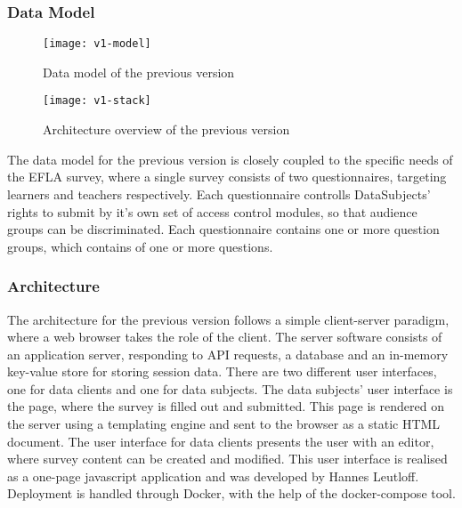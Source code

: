    \subsubsection{Data Model}

   \begin{figure}[H]
        \centering
        \texttt{[image: v1-model]}
        \caption{Data model of the previous version}
        \label{fig:v1-data-model}
    \end{figure}

    \begin{wrapfigure}{o}{.5\textwidth}
        \centering
        \texttt{[image: v1-stack]}
        \caption{Architecture overview of the previous version}
        \label{fig:v1-stack}
    \end{wrapfigure}

    The data model for the previous version is closely coupled to the specific needs of the
    EFLA survey, where a single survey consists of two questionnaires, targeting
    learners and teachers respectively.
    Each questionnaire controlls DataSubjects' rights to submit by it's own set of access 
    control modules, so that audience groups can be discriminated.
    Each questionnaire contains one or more question groups, which contains of
    one or more questions.

    \subsubsection{Architecture}
        The architecture for the previous version follows a simple client-server paradigm, where
        a web browser takes the role of the client. The server software consists of an
        application server, responding to API requests, a database and an in-memory
        key-value store for storing session data. There are two different user interfaces,
        one for data clients and one for data subjects. The data subjects' user interface
        is the page, where the survey is filled out and submitted. This page is rendered
        on the server using a templating engine and sent to the browser as a static HTML document.
        The user interface for data clients presents the user with an editor, where survey content
        can be created and modified. This user interface is realised as a one-page
        javascript application and was developed by Hannes Leutloff. Deployment is handled through
        Docker, with the help of the docker-compose tool.

